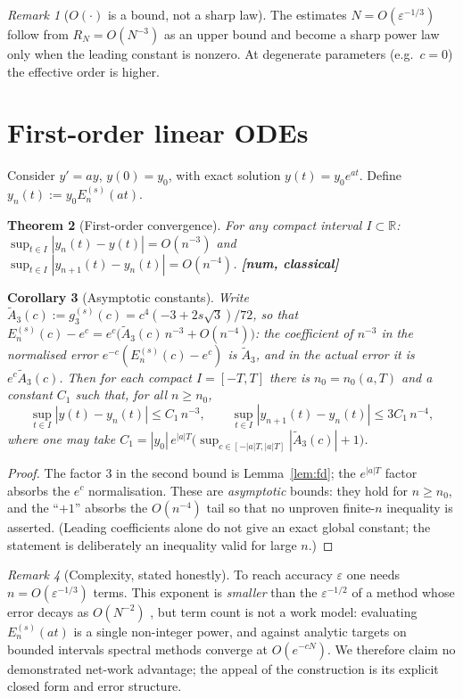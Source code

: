 \documentclass[11pt]{article}
\theoremstyle{plain}
\newtheorem{theorem}{Theorem}
\newtheorem{corollary}[theorem]{Corollary}
\theoremstyle{definition}
\theoremstyle{remark}
\newtheorem{remark}[theorem]{Remark}
\newcommand{\R}{\mathbb{R}}
\begin{document}
\begin{remark}[$O(\cdot)$ is a bound, not a sharp law]\label{rem:sharp}
The estimates $N=O(\varepsilon^{-1/3})$ follow from $R_N=O(N^{-3})$ as an upper
bound and become a sharp power law only when the leading constant is nonzero. At
degenerate parameters (e.g.\ $c=0$) the effective order is higher.
\end{remark}

\section{First-order linear ODEs}

Consider $y'=ay$, $y(0)=y_0$, with exact solution $y(t)=y_0e^{at}$. Define
$y_n(t) := y_0 E_n^{(s)}(at)$.

\begin{theorem}[First-order convergence]\label{thm:first}
For any compact interval $I\subset\R$:
$\sup_{t\in I}|y_n(t)-y(t)| = O(n^{-3})$ and
$\sup_{t\in I}|y_{n+1}(t)-y_n(t)| = O(n^{-4})$.
\hfill\textbf{[num, classical]}
\end{theorem}

\begin{corollary}[Asymptotic constants]\label{cor:const}
Write $\tilde A_3(c) := g_3^{(s)}(c) = c^4(-3+2s\sqrt3)/72$, so that
$E_n^{(s)}(c) - e^c = e^c\bigl(\tilde A_3(c)\,n^{-3} + O(n^{-4})\bigr)$: the
coefficient of $n^{-3}$ in the \emph{normalised} error
$e^{-c}(E_n^{(s)}(c)-e^c)$ is $\tilde A_3$, and in the actual error it is
$e^c\tilde A_3(c)$. Then for each compact $I=[-T,T]$ there is
$n_0=n_0(a,T)$ and a constant $C_1$ such that, for all $n\ge n_0$,
\[
  \sup_{t\in I}|y(t)-y_n(t)|\le C_1\,n^{-3},
  \qquad
  \sup_{t\in I}|y_{n+1}(t)-y_n(t)|\le 3C_1\,n^{-4},
\]
where one may take $C_1 = |y_0|\,e^{|a|T}\bigl(\sup_{c\in[-|a|T,|a|T]}|\tilde A_3(c)| + 1\bigr)$.
\end{corollary}
\begin{proof}
The factor $3$ in the second bound is Lemma~\ref{lem:fd}; the $e^{|a|T}$ factor
absorbs the $e^c$ normalisation. These are \emph{asymptotic} bounds: they hold
for $n\ge n_0$, and the ``$+1$'' absorbs the $O(n^{-4})$ tail so that no
unproven finite-$n$ inequality is asserted. (Leading coefficients alone do not
give an exact global constant; the statement is deliberately an inequality valid
for large $n$.)
\end{proof}

\begin{remark}[Complexity, stated honestly]\label{rem:complexity}
To reach accuracy $\varepsilon$ one needs $n = O(\varepsilon^{-1/3})$ terms. This
exponent is \emph{smaller} than the $\varepsilon^{-1/2}$ of a method whose error
decays as $O(N^{-2})$ \cite{Weniger,BrezinskiRZ}, but term count is not a work
model: evaluating $E_n^{(s)}(at)$ is a single non-integer power, and against
analytic targets on bounded intervals spectral methods converge at $O(e^{-cN})$.
We therefore claim no demonstrated net-work advantage; the appeal of the
construction is its explicit closed form and error structure.
\end{remark}
\end{document}

